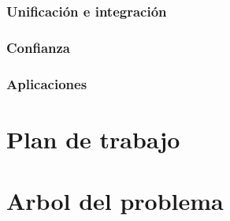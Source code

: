 \documentclass[conference,compsoc]{IEEEtran}
\begin{document}
    \subsubsection{Unificación e integración}

    \subsubsection{Confianza}

    \subsubsection{Aplicaciones}

    \section{Plan de trabajo}






\appendices

\section{Arbol del problema}
\end{document}
